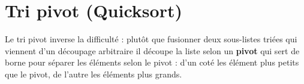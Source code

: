 \newpage
\section{Tri pivot (Quicksort)}
Le tri pivot inverse la difficulté : plutôt que fusionner deux sous-listes triées qui viennent d'un découpage arbitraire il découpe la liste selon un {\bf pivot} qui sert de borne pour séparer les éléments selon le pivot : d'un coté les élément plus petits que le pivot, de l'autre les éléments plus grands.


